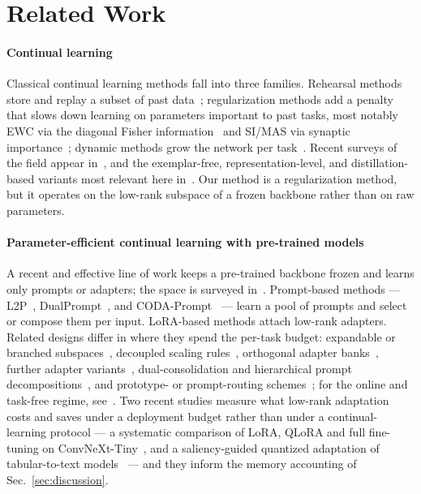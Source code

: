 \section{Related Work}
\label{sec:related}

\paragraph{Continual learning}
Classical continual learning methods fall into three families. Rehearsal methods store
and replay a subset of past data~\cite{rebuffi2017icarl}; regularization methods add a
penalty that slows down learning on parameters important to past tasks, most notably EWC
via the diagonal Fisher information~\cite{kirkpatrick2017overcoming} and SI/MAS via
synaptic importance~\cite{zenke2017continual,aljundi2018memory}; dynamic methods grow the
network per task~\cite{rusu2016progressive,mallya2018packnet}. Recent surveys of the
field appear in~\cite{leo2024survey,razavifar2026harsh,cossu2026streaming}, and the
exemplar-free, representation-level, and distillation-based variants most relevant here
in~\cite{li2025exemplarfree,ferdinand2025featureexp,liu2026diverse,carta2024pld}. Our method is a
regularization method, but it operates on the low-rank subspace of a frozen backbone
rather than on raw parameters.

\paragraph{Parameter-efficient continual learning with pre-trained models}
A recent and effective line of work keeps a pre-trained backbone frozen and learns only
prompts or adapters; the space is
surveyed in~\cite{zhou2024ptmsurvey,zhou2025revisitingcil,coleman2026peftsurvey,yang2025foundationsurvey}.
Prompt-based methods --- L2P~\cite{wang2022l2p},
DualPrompt~\cite{wang2022dualprompt}, and CODA-Prompt~\cite{smith2023coda} --- learn a
pool of prompts and select or compose them per input. LoRA-based methods attach low-rank
adapters. Related designs differ in where they spend the per-task budget: expandable or
branched subspaces~\cite{zhou2024ease,he2025cllora,zhu2025bilora,wang2025plan}, decoupled
scaling rules~\cite{wu2025sdlora}, orthogonal adapter banks~\cite{fang2026olorabanks},
further adapter variants~\cite{chen2024cat,li2026adapterx,wang2025adapters,luo2025eratdlora},
dual-consolidation and hierarchical prompt
decompositions~\cite{zhou2025duct,wang2023hideprompt}, and prototype- or prompt-routing
schemes~\cite{pan2026prototype,xi2025pkenet,rebillard2025cvm,zhao2027talon}; for the online
and task-free regime, see~\cite{wei2025onlinelora}. Two recent studies measure what low-rank
adaptation costs and saves under a deployment budget rather than under a continual-learning
protocol --- a systematic comparison of {LoRA}, {QLoRA} and full fine-tuning on
{ConvNeXt-Tiny}~\cite{bayattoksoz2026sensors}, and a saliency-guided quantized adaptation of
tabular-to-text models~\cite{bayattoksoz2026tabeng} --- and they inform the memory accounting
of Sec.~\ref{sec:discussion}.

